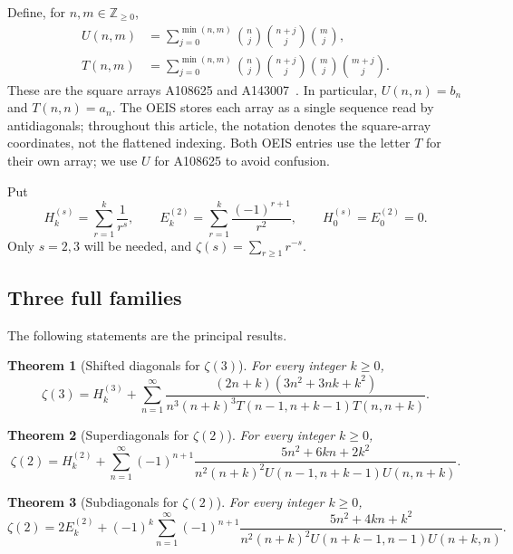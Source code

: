\documentclass[11pt]{article}
\numberwithin{equation}{section}
\newtheorem{theorem}{Theorem}[section]
\theoremstyle{definition}
\theoremstyle{remark}
\newcommand{\Z}{\mathbb Z}
\newcommand{\HS}[2]{H_{#1}^{(#2)}}
\newcommand{\ES}[1]{E_{#1}^{(2)}}
\begin{document}
Define, for $n,m\in\Z_{\geq0}$,
\begin{align}
 U(n,m)&=\sum_{j=0}^{\min(n,m)}
      \binom nj\binom{n+j}j\binom mj,\label{eq:U}\\
 T(n,m)&=\sum_{j=0}^{\min(n,m)}
      \binom nj\binom{n+j}j\binom mj\binom{m+j}j.\label{eq:T}
\end{align}
These are the square arrays A108625 and A143007~\cite{oeisU,oeisT}.
In particular, $U(n,n)=b_n$ and $T(n,n)=a_n$.
The OEIS stores each array as a single sequence read by antidiagonals;
throughout this article, the notation denotes the square-array coordinates,
not the flattened indexing. Both OEIS entries use the letter $T$ for their
own array; we use $U$ for A108625 to avoid confusion.

Put
\[
 \HS{k}{s}=\sum_{r=1}^k\frac1{r^s},\qquad
 \ES{k}=\sum_{r=1}^k\frac{(-1)^{r+1}}{r^2},
 \qquad \HS{0}{s}=\ES{0}=0.
\]
Only $s=2,3$ will be needed, and $\zeta(s)=\sum_{r\geq1}r^{-s}$.

\subsection{Three full families}
The following statements are the principal results.

\begin{theorem}[Shifted diagonals for $\zeta(3)$]\label{thm:main3}
For every integer $k\geq0$,
\begin{equation}\label{eq:main3}
\boxed{\displaystyle
\zeta(3)=\HS{k}{3}
 +\sum_{n=1}^{\infty}
 \frac{(2n+k)(3n^2+3nk+k^2)}
 {n^3(n+k)^3T(n-1,n+k-1)T(n,n+k)}.}
\end{equation}
\end{theorem}

\begin{theorem}[Superdiagonals for $\zeta(2)$]\label{thm:main2p}
For every integer $k\geq0$,
\begin{equation}\label{eq:main2p}
\boxed{\displaystyle
\zeta(2)=\HS{k}{2}
 +\sum_{n=1}^{\infty}(-1)^{n+1}
 \frac{5n^2+6kn+2k^2}
 {n^2(n+k)^2U(n-1,n+k-1)U(n,n+k)}.}
\end{equation}
\end{theorem}

\begin{theorem}[Subdiagonals for $\zeta(2)$]\label{thm:main2m}
For every integer $k\geq0$,
\begin{equation}\label{eq:main2m}
\boxed{\displaystyle
\zeta(2)=2\ES{k}
 +(-1)^k\sum_{n=1}^{\infty}(-1)^{n+1}
 \frac{5n^2+4kn+k^2}
 {n^2(n+k)^2U(n+k-1,n-1)U(n+k,n)}.}
\end{equation}
\end{theorem}
\end{document}
